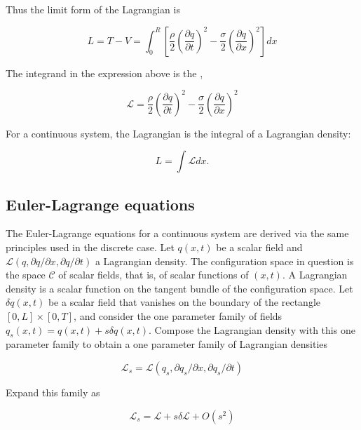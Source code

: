 Thus the limit form of the Lagrangian is

\begin{equation}
L = T - V 
= 
 \int_0^R \left[ \frac{\rho}{2}\left(\frac{\partial q}{\partial t} \right)^2 
 -
\frac{\sigma}{2} \left(\frac{\partial q}{\partial x} \right)^2 \right]dx
\end{equation}

The integrand in the expression above is the ,

\begin{equation}
\mathcal{L} = \frac{\rho}{2}\left(\frac{\partial q}{\partial t} \right)^2 
 -
\frac{\sigma}{2} \left(\frac{\partial q}{\partial x} \right)^2
\end{equation}

For a continuous system, the Lagrangian is the integral of a Lagrangian density:

\begin{equation}
L = \int \mathcal{L} dx .
\end{equation}


\subsection{Euler-Lagrange equations}

The Euler-Lagrange equations for a continuous system are derived via the same principles used in the discrete case.  Let $q(x, t)$ be a scalar field and $\mathcal{L}(q, \partial q/\partial x, \partial q/\partial t)$ a Lagrangian density. The configuration space in question is the space $\mathcal{C}$ of scalar fields, that is, of scalar functions of $(x,t)$.  A Lagrangian density is a scalar function on the tangent bundle of the configuration space.  Let $\delta q(x,t)$ be a scalar field that vanishes on the boundary of the rectangle $[0,L]\times[0,T]$, and consider
the one parameter family of fields $q_s(x,t) = q(x,t) + s\delta q(x,t)$. Compose the Lagrangian density with this one parameter family to obtain a one parameter family of Lagrangian densities

\begin{equation}
\mathcal{L}_s = \mathcal{L}(q_s, \partial q_s/\partial x,  \partial q_s/\partial t)
\end{equation}

Expand this family as

\begin{equation}
\mathcal{L}_s = \mathcal{L} + s\delta \mathcal{L} + O(s^2)
\end{equation}

